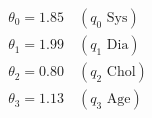 \documentclass[preview]{standalone}
\begin{document}
\begin{align*}
\theta_0 = 1.85 \quad (q_0 \text{ Sys})\\ \theta_1 = 1.99 \quad (q_1 \text{ Dia})\\ \theta_2 = 0.80 \quad (q_2 \text{ Chol})\\ \theta_3 = 1.13 \quad (q_3 \text{ Age})
\end{align*}
\end{document}
